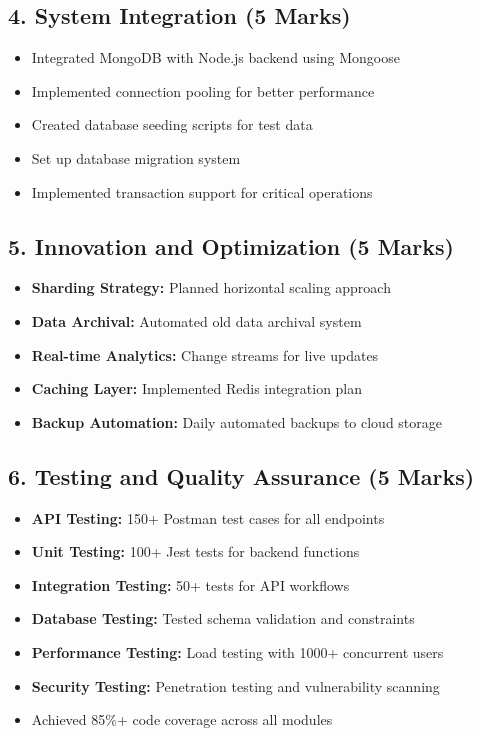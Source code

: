 \documentclass[12pt,a4paper]{article}
\begin{document}
\subsection*{4. System Integration (5 Marks)}
\begin{itemize}[leftmargin=*]
    \item Integrated MongoDB with Node.js backend using Mongoose
    \item Implemented connection pooling for better performance
    \item Created database seeding scripts for test data
    \item Set up database migration system
    \item Implemented transaction support for critical operations
\end{itemize}

\subsection*{5. Innovation and Optimization (5 Marks)}
\begin{itemize}[leftmargin=*]
    \item \textbf{Sharding Strategy:} Planned horizontal scaling approach
    \item \textbf{Data Archival:} Automated old data archival system
    \item \textbf{Real-time Analytics:} Change streams for live updates
    \item \textbf{Caching Layer:} Implemented Redis integration plan
    \item \textbf{Backup Automation:} Daily automated backups to cloud storage
\end{itemize}

\subsection*{6. Testing and Quality Assurance (5 Marks)}
\begin{itemize}[leftmargin=*]
    \item \textbf{API Testing:} 150+ Postman test cases for all endpoints
    \item \textbf{Unit Testing:} 100+ Jest tests for backend functions
    \item \textbf{Integration Testing:} 50+ tests for API workflows
    \item \textbf{Database Testing:} Tested schema validation and constraints
    \item \textbf{Performance Testing:} Load testing with 1000+ concurrent users
    \item \textbf{Security Testing:} Penetration testing and vulnerability scanning
    \item Achieved 85\%+ code coverage across all modules
\end{itemize}
\end{document}
